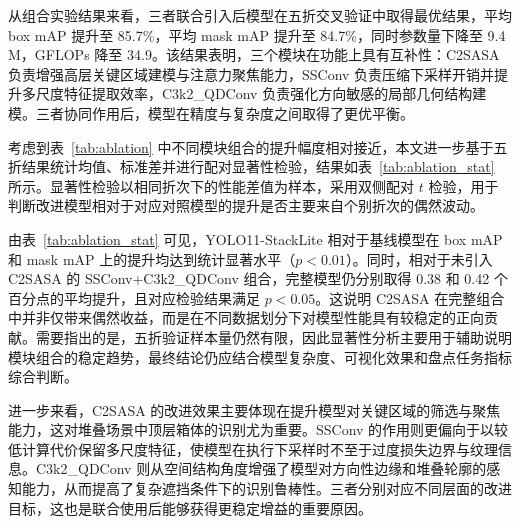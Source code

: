 从组合实验结果来看，三者联合引入后模型在五折交叉验证中取得最优结果，平均 box mAP 提升至 85.7\%，平均 mask mAP 提升至 84.7\%，同时参数量下降至 9.4 M，GFLOPs 降至 34.9。该结果表明，三个模块在功能上具有互补性：C2SASA 负责增强高层关键区域建模与注意力聚焦能力，SSConv 负责压缩下采样开销并提升多尺度特征提取效率，C3k2\_QDConv 负责强化方向敏感的局部几何结构建模。三者协同作用后，模型在精度与复杂度之间取得了更优平衡。

考虑到表~\ref{tab:ablation} 中不同模块组合的提升幅度相对接近，本文进一步基于五折结果统计均值、标准差并进行配对显著性检验，结果如表~\ref{tab:ablation_stat} 所示。显著性检验以相同折次下的性能差值为样本，采用双侧配对 $t$ 检验，用于判断改进模型相对于对应对照模型的提升是否主要来自个别折次的偶然波动。

\begin{table}[htbp]
  \label{tab:ablation_stat}
  \centering
  \small
\end{table}

由表~\ref{tab:ablation_stat} 可见，YOLO11-StackLite 相对于基线模型在 box mAP 和 mask mAP 上的提升均达到统计显著水平（$p<0.01$）。同时，相对于未引入 C2SASA 的 SSConv+C3k2\_QDConv 组合，完整模型仍分别取得 0.38 和 0.42 个百分点的平均提升，且对应检验结果满足 $p<0.05$。这说明 C2SASA 在完整组合中并非仅带来偶然收益，而是在不同数据划分下对模型性能具有较稳定的正向贡献。需要指出的是，五折验证样本量仍然有限，因此显著性分析主要用于辅助说明模块组合的稳定趋势，最终结论仍应结合模型复杂度、可视化效果和盘点任务指标综合判断。

进一步来看，C2SASA 的改进效果主要体现在提升模型对关键区域的筛选与聚焦能力，这对堆叠场景中顶层箱体的识别尤为重要。SSConv 的作用则更偏向于以较低计算代价保留多尺度特征，使模型在执行下采样时不至于过度损失边界与纹理信息。C3k2\_QDConv 则从空间结构角度增强了模型对方向性边缘和堆叠轮廓的感知能力，从而提高了复杂遮挡条件下的识别鲁棒性。三者分别对应不同层面的改进目标，这也是联合使用后能够获得更稳定增益的重要原因。

